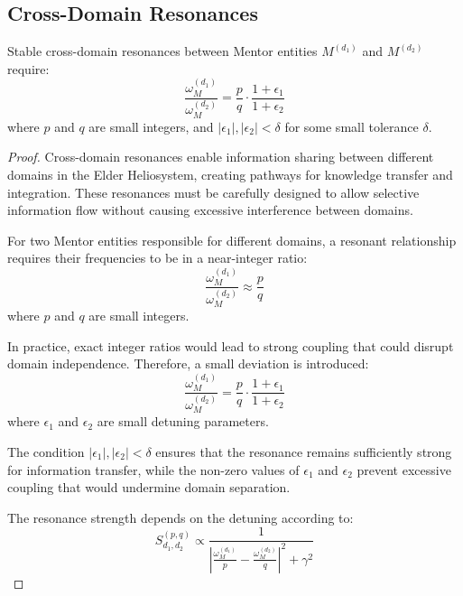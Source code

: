 \subsection{Cross-Domain Resonances}

\begin{theorem}
Stable cross-domain resonances between Mentor entities $M^{(d_1)}$ and $M^{(d_2)}$ require:
\begin{equation}
\frac{\omega_{M}^{(d_1)}}{\omega_{M}^{(d_2)}} = \frac{p}{q} \cdot \frac{1 + \epsilon_1}{1 + \epsilon_2}
\end{equation}
where $p$ and $q$ are small integers, and $|\epsilon_1|, |\epsilon_2| < \delta$ for some small tolerance $\delta$.
\end{theorem}

\begin{proof}
Cross-domain resonances enable information sharing between different domains in the Elder Heliosystem, creating pathways for knowledge transfer and integration. These resonances must be carefully designed to allow selective information flow without causing excessive interference between domains.

For two Mentor entities responsible for different domains, a resonant relationship requires their frequencies to be in a near-integer ratio:
\begin{equation}
\frac{\omega_{M}^{(d_1)}}{\omega_{M}^{(d_2)}} \approx \frac{p}{q}
\end{equation}
where $p$ and $q$ are small integers.

In practice, exact integer ratios would lead to strong coupling that could disrupt domain independence. Therefore, a small deviation is introduced:
\begin{equation}
\frac{\omega_{M}^{(d_1)}}{\omega_{M}^{(d_2)}} = \frac{p}{q} \cdot \frac{1 + \epsilon_1}{1 + \epsilon_2}
\end{equation}
where $\epsilon_1$ and $\epsilon_2$ are small detuning parameters.

The condition $|\epsilon_1|, |\epsilon_2| < \delta$ ensures that the resonance remains sufficiently strong for information transfer, while the non-zero values of $\epsilon_1$ and $\epsilon_2$ prevent excessive coupling that would undermine domain separation.

The resonance strength depends on the detuning according to:
\begin{equation}
S_{d_1,d_2}^{(p,q)} \propto \frac{1}{\left|\frac{\omega_{M}^{(d_1)}}{p} - \frac{\omega_{M}^{(d_2)}}{q}\right|^2 + \gamma^2}
\end{equation}


\end{proof}
